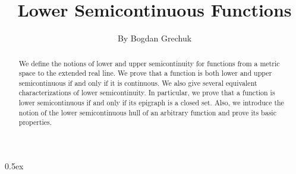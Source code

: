 \documentclass[11pt,a4paper]{article}
\begin{document}
\title{Lower Semicontinuous Functions}
\author{By Bogdan Grechuk}
\maketitle

\begin{abstract}
  We define the notions of lower and upper semicontinuity for functions from a
  metric space to the extended real line. We prove that a function is both lower
  and upper semicontinuous if and only if it is continuous. We also give several
  equivalent characterizations of lower semicontinuity. In particular, we prove
  that a function is lower semicontinuous if and only if its epigraph is a
  closed set. Also, we introduce the notion of the lower semicontinuous hull of
  an arbitrary function and prove its basic properties.
\end{abstract}

\tableofcontents

\parindent 0pt\parskip 0.5ex


%
%
\end{document}
